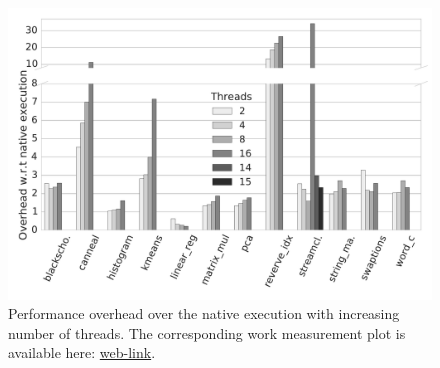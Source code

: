 
\begin{figure}[t]
\centering
\includegraphics[scale=0.25]{figure/benchmarks/times-Total_overheads.pdf}
\caption{Performance overhead  over the native execution with increasing number of threads. The corresponding work measurement plot is available here: \href{https://mic92.github.io/inspector/index.html\#graph2}{web-link}.}
\label{fig:overheads}
\end{figure}
